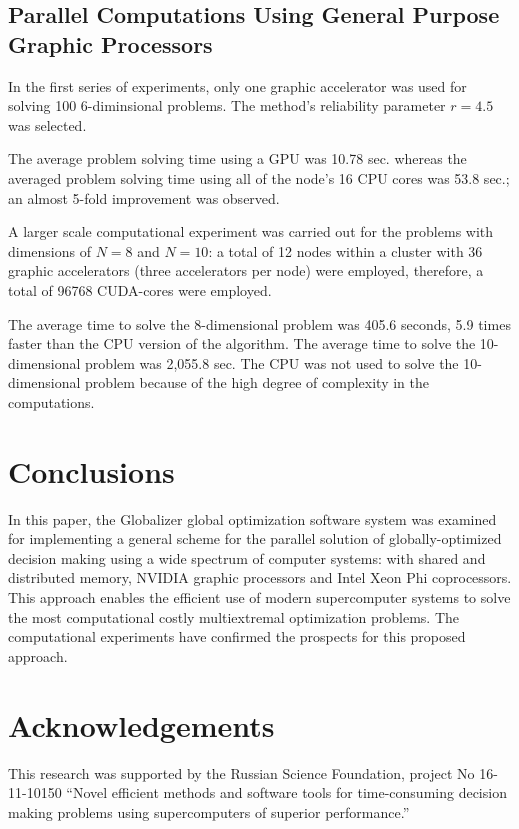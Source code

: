 \documentclass{gOMS2e}
\theoremstyle{plain}%
\theoremstyle{definition}
\theoremstyle{remark}
\begin{document}
\subsection{Parallel Computations Using General Purpose Graphic Processors}
In the first series of experiments, only one graphic accelerator was used for solving
100 6-diminsional problems. The method’s reliability parameter \(r=4.5\) was selected.
\par
The average problem solving time using a GPU was 10.78 sec. whereas the averaged problem
solving time using all of the node’s 16 CPU cores was 53.8 sec.; an almost 5-fold improvement was observed.
\par
A larger scale computational experiment was carried out for the problems with
dimensions of \(N=8\) and \(N=10\): a total of 12 nodes within a cluster with 36
graphic accelerators (three accelerators per node) were employed, therefore, a total
of 96768 CUDA-cores were employed.
\par
The average time to solve the 8-dimensional problem was 405.6 seconds, 5.9 times
faster than the CPU version of the algorithm. The average time to solve the
10-dimensional problem was 2,055.8 sec. The CPU was not used to solve the 10-dimensional
problem because of the high degree of complexity in the computations.

\section{Conclusions}
\label{sec:concl}
In this paper, the Globalizer global optimization software system was examined for
implementing a general scheme for the parallel solution of globally-optimized decision
making using a wide spectrum of computer systems: with shared and distributed memory,
NVIDIA graphic processors and Intel Xeon Phi coprocessors. This approach enables the
efficient use of modern supercomputer systems to solve the most computational costly
multiextremal optimization problems. The computational experiments have confirmed the
prospects for this proposed approach.

\section*{Acknowledgements}
This research was supported by the Russian Science Foundation, project No 16-11-10150
``Novel efficient methods and software tools for time-consuming decision making problems using supercomputers of superior performance.''
\end{document}
